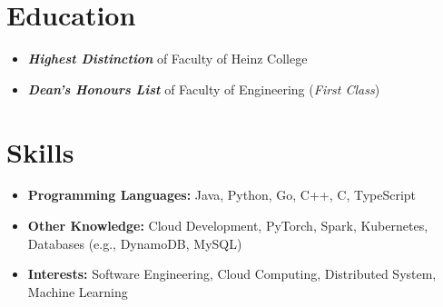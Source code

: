 \documentclass{resume}
\begin{document}



\section{Education}
\begin{itemize}[parsep=0.5ex]
  \item \textbf{\textit{Highest Distinction}} of Faculty of Heinz College
\end{itemize}
\begin{itemize}[parsep=0.5ex]
  \item \textbf{\textit{Dean's Honours List}} of Faculty of Engineering (\textit{First Class})
\end{itemize}

\section{Skills}
\begin{itemize}[parsep=0.5ex]
  \item \textbf{Programming Languages:} Java, Python, Go, C++, C, TypeScript
  \item \textbf{Other Knowledge:} Cloud Development, PyTorch, Spark, Kubernetes, Databases (e.g., DynamoDB, MySQL)
  \item \textbf{Interests:} Software Engineering, Cloud Computing, Distributed System, Machine Learning
\end{itemize}
\end{document}
